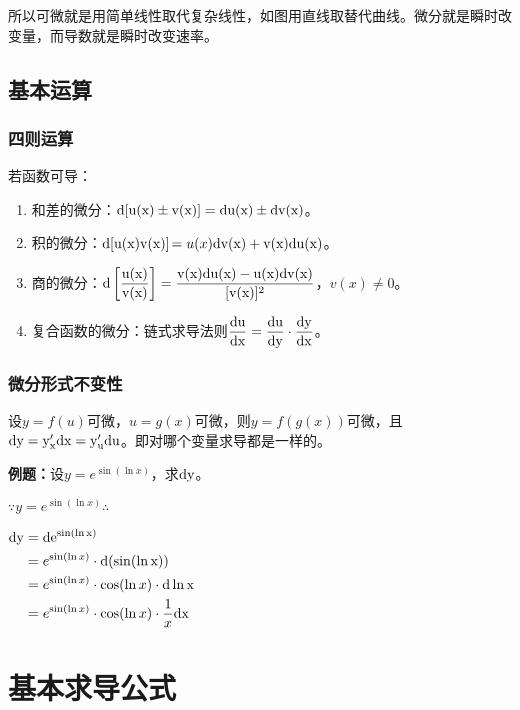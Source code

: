 \documentclass[UTF8, 12pt]{ctexart}
\begin{document}
所以可微就是用简单线性取代复杂线性，如图用直线取替代曲线。微分就是瞬时改变量，而导数就是瞬时改变速率。

\subsection{基本运算}

\subsubsection{四则运算}

若函数可导：

\begin{enumerate}
    \item 和差的微分：$\rm{d}[u(x)\pm v(x)]=\rm{d}u(x)\pm\rm{d}v(x)$。
    \item 积的微分：$\rm{d}[u(x)v(x)]$$=u(x)\rm{d}v(x)+v(x)\rm{d}u(x)$。
    \item 商的微分：$\rm{d}\left[\dfrac{u(x)}{v(x)}\right]=\dfrac{v(x)\rm{d}u(x)-u(x)\rm{d}v(x)}{[v(x)]^2}$，$v(x)\neq 0$。
    \item 复合函数的微分：链式求导法则$\dfrac{\rm{d}u}{\rm{d}x}=\dfrac{\rm{d}u}{\rm{d}y}\cdot\dfrac{\rm{d}y}{\rm{d}x}$。
\end{enumerate}

\subsubsection{微分形式不变性}

设$y=f(u)$可微，$u=g(x)$可微，则$y=f(g(x))$可微，且$\rm{d}y=y'_x\rm{d}x=y'_u\rm{d}u$。即对哪个变量求导都是一样的。

\textbf{例题：}设$y=e^{\sin(\ln x)}$，求$\rm{d}y$。

$\because y=e^{\sin(\ln x)} \therefore$

$
\begin{aligned}
    \rm{d}y &=\rm{d}e^{\sin(\ln x)} \\
    & =e^{\sin(\ln x)}\cdot\rm{d}(\sin(\ln x)) \\
    & =e^{\sin(\ln x)}\cdot\cos(\ln x)\cdot\rm{d}\ln x \\
    & =e^{\sin(\ln x)}\cdot\cos(\ln x)\cdot\dfrac{1}{x}\rm{d}x
\end{aligned}
$

\section{基本求导公式}
\end{document}
